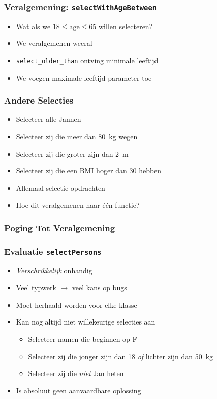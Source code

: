 \begin{frame}
  \frametitle{Veralgemening: \texttt{selectWithAgeBetween}}
  \begin{itemize}
    \item Wat als we $18 \leq \mathrm{age} \leq 65$ willen selecteren?
    \item We veralgemenen weeral
    \item \texttt{select\_older\_than} ontving minimale leeftijd
    \item We voegen maximale leeftijd parameter toe
  \end{itemize}
  \vskip5mm
\end{frame}

\begin{frame}
  \frametitle{Andere Selecties}
  \begin{itemize}
    \item Selecteer alle Jannen
    \item Selecteer zij die meer dan \SI{80}{\kilogram} wegen
    \item Selecteer zij die groter zijn dan \SI{2}{\meter}
    \item Selecteer zij die een BMI hoger dan 30 hebben
  \end{itemize}
  \vskip5mm
  \begin{itemize}
    \item Allemaal selectie-opdrachten
    \item Hoe dit veralgemenen naar \'e\'en functie?
  \end{itemize}
\end{frame}

\begin{frame}
  \frametitle{Poging Tot Veralgemening}
\end{frame}

\begin{frame}
  \frametitle{Evaluatie \texttt{selectPersons}}
  \begin{itemize}
    \item \emph{Verschrikkelijk} onhandig
    \item Veel typwerk $\rightarrow$ veel kans op bugs
    \item Moet herhaald worden voor elke klasse
    \item Kan nog altijd niet willekeurige selecties aan
          \begin{itemize}
            \item Selecteer namen die beginnen op F
            \item Selecteer zij die jonger zijn dan 18 \emph{of} lichter zijn dan \SI{50}{\kilogram}
            \item Selecteer zij die \emph{niet} Jan heten
          \end{itemize}
    \item Is absoluut geen aanvaardbare oplossing
  \end{itemize}
\end{frame}

